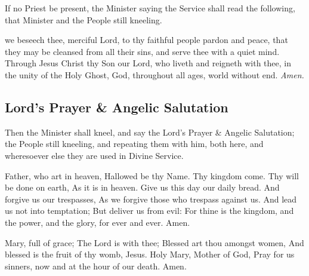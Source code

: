 \clearpage
\begin{rubric}
    If no Priest be present, the Minister saying the Service shall read the following, that Minister and the People still kneeling.
\end{rubric}
 we beseech thee, merciful Lord, to thy faithful people pardon and peace, that they may be cleansed from all their sins, and serve thee with a quiet mind. Through Jesus Christ thy Son our Lord, who liveth and reigneth with thee, in the unity of the Holy Ghost, God, throughout all ages, world without end. \textit{Amen.}

\subsection{Lord's Prayer \& Angelic Salutation}
\begin{rubric}
    Then the Minister shall kneel, and say the Lord's Prayer \& Angelic Salutation; the People still kneeling, and repeating them with him, both here, and wheresoever else they are used in Divine Service.
\end{rubric}

 Father, who art in heaven, Hallowed be thy Name. Thy kingdom come. Thy will be done on earth, As it is in heaven. Give us this day our daily bread. And forgive us our trespasses, As we forgive those who trespass against us. And lead us not into temptation; But deliver us from evil: For thine is the kingdom, and the power, and the glory, for ever and ever. Amen.

 Mary, full of grace; The Lord is with thee; Blessed art thou amongst women, And blessed is the fruit of thy womb, Jesus. Holy Mary, Mother of God, Pray for us sinners, now and at the hour of our death. Amen.
